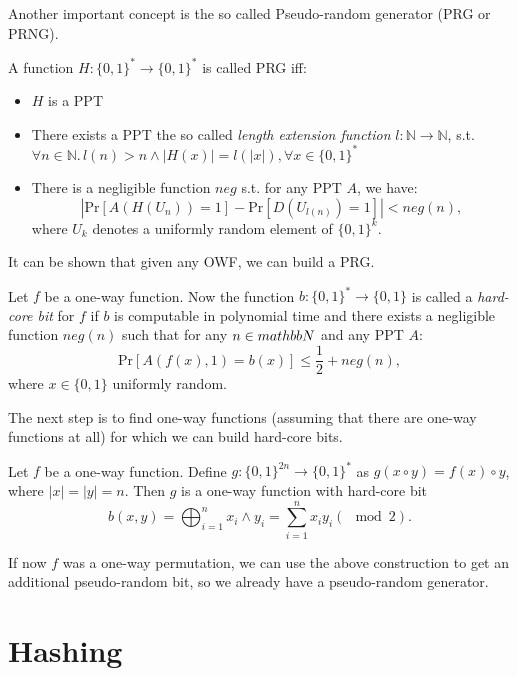 Another important concept is the so called Pseudo-random generator (PRG or PRNG). 
\begin{definition}[PRGs]
 A function $H:\{0,1\}^*\to \{0,1\}^*$ is called PRG iff:
 \begin{itemize}
  \item $H$ is a PPT
  \item There exists a PPT the so called \emph{length extension function} $l:\mathbb{N}\to\mathbb{N}$, s.t. $\forall n\in\mathbb{N}.\,l(n)>n\land \left|H(x)\right|=l(\left|x\right|), \forall x\in\{0,1\}^*$
  \item There is a negligible function $neg$ s.t. for any PPT $A$, we have:
  $$\left|\mathrm{Pr}\left[A(H(U_n))=1\right]-\mathrm{Pr}\left[D(U_{l(n)})=1\right]\right|<neg(n),$$ where $U_k$ denotes a uniformly random element of $\{0,1\}^k$. 
 \end{itemize}
\end{definition}

It can be shown that given any OWF, we can build a PRG. %
\begin{definition}
 Let $f$ be a one-way function. Now the function $b:\{0,1\}^*\to\{0,1\}$ is called a \emph{hard-core bit} for $f$ if $b$ is computable in polynomial time and there exists a negligible function $neg(n)$ such that for any $n\in\\mathbb{N}$ and any PPT $A$:
 $$\mathrm{Pr}\left[A(f(x),1)=b(x)\right]\leq\frac{1}{2}+neg(n), $$ where $x\in\{0,1\}$ uniformly random. 
\end{definition}

The next step is to find one-way functions (assuming that there are one-way functions at all) for which we can build hard-core bits. 
\begin{theorem}
 Let $f$ be a one-way function. Define $g:\{0,1\}^{2n}\to\{0,1\}^*$ as $g(x\circ y)=f(x)\circ y$, where $\left|x\right|=\left|y\right|=n$. Then $g$ is a one-way function with hard-core bit $$b(x,y)=\bigoplus_{i=1}^n x_i\land y_i=\sum_{i=1}^{n}x_iy_i (\mod 2).$$
\end{theorem}
If now $f$ was a one-way permutation, we can use the above construction to get an additional pseudo-random bit, so we already have a pseudo-random generator.


\section{Hashing}

